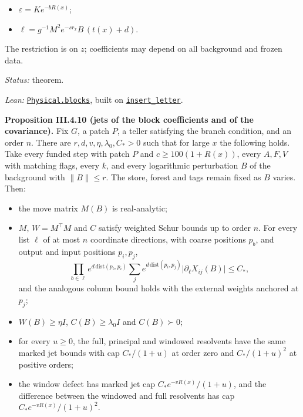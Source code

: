 \documentclass[
  letterpaper,
  11pt]{article}
\providecommand{\tightlist}{%
  \setlength{\itemsep}{0pt}\setlength{\parskip}{0pt}}
\begin{document}
\begin{itemize}
\tightlist
\item
  \(\varepsilon=Ke^{-bR(x)}\);
\item
  \(\ell=g^{-1}M^2e^{-sr_x}B\,(t(x)+d)\).
\end{itemize}

The restriction is on \(z\); coefficients may depend on all background
and frozen data.

\emph{Status:} theorem.

\emph{Lean:}
\href{https://github.com/yang-mills-group/OpenAI-YM-20261028/blob/3456e5e75cf8d4cd558955a5c7638fba2d68f464/YM/SectorTools/PHYSICAL_GAUSSIAN_INSERTION/Consumer.lean\#L167-L199}{\texttt{Physical.blocks}},
built on
\href{https://github.com/yang-mills-group/OpenAI-YM-20261028/blob/3456e5e75cf8d4cd558955a5c7638fba2d68f464/YM/SectorTools/PHYSICAL_GAUSSIAN_INSERTION/Insertion.lean\#L120-L172}{\texttt{insert\_letter}}.

\textbf{Proposition III.4.10 (jets of the block coefficients and of the
covariance).} Fix \(G\), a patch \(P\), a teller satisfying the branch
condition, and an order \(n\). There are \(r,d,v,\eta,\lambda_0,C_*>0\)
such that for large \(x\) the following holds. Take every funded step
with patch \(P\) and \(c\ge100(1+R(x))\), every \(A,F,V\) with matching
flags, every \(k\), and every logarithmic perturbation \(B\) of the
background with \(\lVert B\rVert\le r\). The store, forest and tags
remain fixed as \(B\) varies. Then:

\begin{itemize}
\item
  the move matrix \(M(B)\) is real-analytic;
\item
  \(M\), \(W=M^{\top}M\) and \(C\) satisfy weighted Schur bounds up to
  order \(n\). For every list \(\ell\) of at most \(n\) coordinate
  directions, with coarse positions \(p_b\), and output and input
  positions \(p_i,p_j\),
  \[\prod_{b\in\ell}e^{d\,\mathrm{dist}(p_b,p_i)}\sum_j e^{d\,\mathrm{dist}(p_i,p_j)}\lvert\partial_\ell X_{ij}(B)\rvert\le C_*,\]
  and the analogous column bound holds with the external weights
  anchored at \(p_j\);
\item
  \(W(B)\ge\eta I\), \(C(B)\ge\lambda_0 I\) and \(C(B)\succ0\);
\item
  for every \(u\ge0\), the full, principal and windowed resolvents have
  the same marked jet bounds with cap \(C_* /(1+u)\) at order zero and
  \(C_* /(1+u)^2\) at positive orders;
\item
  the window defect has marked jet cap \(C_*e^{-vR(x)}/(1+u)\), and the
  difference between the windowed and full resolvents has cap
  \(C_*e^{-vR(x)}/(1+u)^2\).
\end{itemize}
\end{document}
